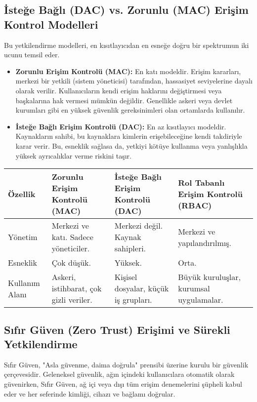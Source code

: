\subsection{İsteğe Bağlı (DAC) vs. Zorunlu (MAC) Erişim Kontrol Modelleri}

Bu yetkilendirme modelleri, en kısıtlayıcıdan en esneğe doğru bir spektrumun iki ucunu temsil eder.

\begin{itemize}
    \item \textbf{Zorunlu Erişim Kontrolü (MAC):} En katı modeldir. Erişim kararları, merkezi bir yetkili (sistem yöneticisi) tarafından, hassasiyet seviyelerine dayalı olarak verilir. Kullanıcıların kendi erişim haklarını değiştirmesi veya başkalarına hak vermesi mümkün değildir. Genellikle askeri veya devlet kurumları gibi en yüksek güvenlik gereksinimleri olan ortamlarda kullanılır.
    \item \textbf{İsteğe Bağlı Erişim Kontrolü (DAC):} En az kısıtlayıcı modeldir. Kaynakların sahibi, bu kaynaklara kimlerin erişebileceğine kendi takdiriyle karar verir. Bu, esneklik sağlasa da, yetkiyi kötüye kullanma veya yanlışlıkla yüksek ayrıcalıklar verme riskini taşır.
\end{itemize}

\begin{tabularx}{\textwidth}{|l|X|X|X|}
\hline
\textbf{Özellik} & \textbf{Zorunlu Erişim Kontrolü (MAC)} & \textbf{İsteğe Bağlı Erişim Kontrolü (DAC)} & \textbf{Rol Tabanlı Erişim Kontrolü (RBAC)} \\
\hline
Yönetim & Merkezi ve katı. Sadece yöneticiler. & Merkezi değil. Kaynak sahipleri. & Merkezi ve yapılandırılmış. \\
\hline
Esneklik & Çok düşük. & Yüksek. & Orta. \\
\hline
Kullanım Alanı & Askeri, istihbarat, çok gizli veriler. & Kişisel dosyalar, küçük iş grupları. & Büyük kuruluşlar, kurumsal uygulamalar. \\
\hline
\end{tabularx}

\subsection{Sıfır Güven (Zero Trust) Erişimi ve Sürekli Yetkilendirme}

Sıfır Güven, "Asla güvenme, daima doğrula" prensibi üzerine kurulu bir güvenlik çerçevesidir. Geleneksel güvenlik, ağın içindeki kullanıcılara otomatik olarak güvenirken, Sıfır Güven, ağ içi veya dışı tüm erişim denemelerini şüpheli kabul eder ve her seferinde kimliği, cihazı ve bağlamı doğrular.

